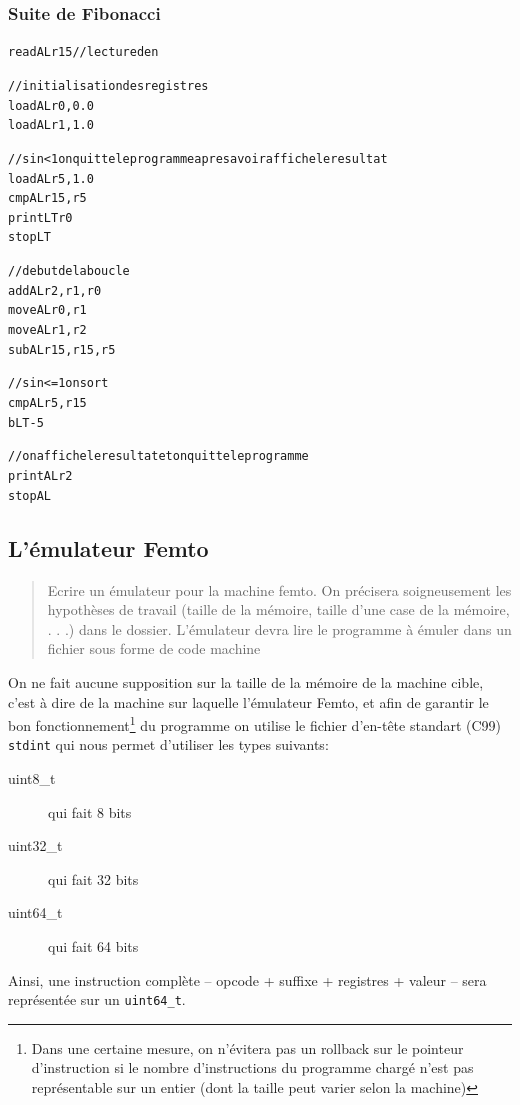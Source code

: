 \documentclass[11pt,a4paper]{article}
\begin{document}
\subsubsection*{Suite de Fibonacci}

\begin{alltt}
readAL r15 // lecture de n

// initialisation des registres
loadAL r0, 0.0
loadAL r1, 1.0

// si n < 1 on quitte le programme apres avoir affiche le resultat
loadAL r5, 1.0
cmpAL r15, r5
printLT r0
stopLT

// debut de la boucle
addAL r2, r1, r0
moveAL r0, r1
moveAL r1, r2
subAL r15, r15, r5

// si n <= 1 on sort
cmpAL r5, r15
bLT -5

// on affiche le resultat et on quitte le programme
printAL r2
stopAL
\end{alltt}

\subsection{L'émulateur Femto}

\begin{quote}
Ecrire un émulateur pour la machine femto. On précisera soigneusement les hypothèses de travail
(taille de la mémoire, taille d’une case de la mémoire, . . .) dans le dossier. L’émulateur devra
lire le programme à émuler dans un fichier sous forme de code machine
\end{quote}

On ne fait aucune supposition sur la taille de la mémoire de la machine cible, c'est à dire de la
machine sur laquelle l'émulateur Femto, et afin de garantir le bon fonctionnement\footnote{Dans une
certaine mesure, on n'évitera pas un rollback sur le pointeur d'instruction si le nombre
d'instructions du programme chargé n'est pas représentable sur un entier (dont la taille peut varier
selon la machine)} du programme on utilise le fichier d'en-tête standart (C99) \texttt{stdint} qui
nous permet d'utiliser les types suivants:
\begin{description}
\item[uint8\_t] qui fait 8 bits
\item[uint32\_t] qui fait 32 bits
\item[uint64\_t] qui fait 64 bits
\end{description}

Ainsi, une instruction complète -- opcode + suffixe + registres + valeur -- sera représentée sur un
\texttt{uint64\_t}.
\end{document}
